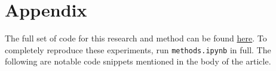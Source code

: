 \chapter{Appendix}
\label{chap:appendix}

The full set of code for this research and method can be found \href{https://github.com/hangulu/thesis}{here}. To completely reproduce these experiments, run \texttt{methods.ipynb} in full. The following are notable code snippets mentioned in the body of the article.




